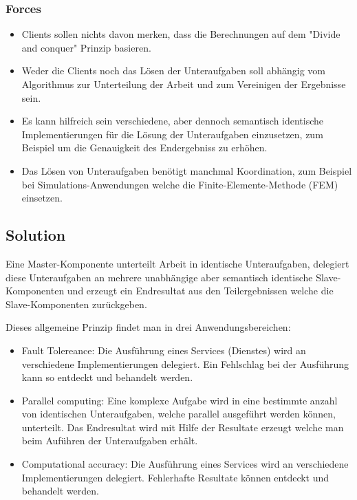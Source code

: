 \subsubsection*{Forces}


\begin{itemize}
	\item Clients sollen nichts davon merken, dass die Berechnungen auf dem "Divide and conquer" Prinzip basieren.
	\item Weder die Clients noch das Lösen der Unteraufgaben soll abhängig vom Algorithmus zur Unterteilung der Arbeit und zum Vereinigen der Ergebnisse sein.
	\item Es kann hilfreich sein verschiedene, aber dennoch semantisch identische Implementierungen für die Lösung der Unteraufgaben einzusetzen, zum Beispiel um die Genauigkeit des Endergebniss zu erhöhen.
	\item Das Lösen von Unteraufgaben benötigt manchmal Koordination, zum Beispiel bei Simulations-Anwendungen welche die Finite-Elemente-Methode (FEM) einsetzen.
\end{itemize}

\subsection*{Solution}


Eine Master-Komponente unterteilt Arbeit in identische Unteraufgaben, delegiert diese Unteraufgaben an mehrere unabhängige aber semantisch identische Slave-Komponenten und erzeugt ein Endresultat aus den Teilergebnissen welche die Slave-Komponenten zurückgeben.

Dieses allgemeine Prinzip findet man in drei Anwendungsbereichen:

\begin{itemize}
	\item Fault Tolereance: Die Ausführung eines Services (Dienstes) wird an verschiedene Implementierungen delegiert. Ein Fehlschlag bei der Ausführung kann so entdeckt und behandelt werden.
	\item Parallel computing: Eine komplexe Aufgabe wird in eine bestimmte anzahl von identischen Unteraufgaben, welche parallel ausgeführt werden können, unterteilt. Das Endresultat wird mit Hilfe der Resultate erzeugt welche man beim Auführen der Unteraufgaben erhält.
	\item Computational accuracy: Die Ausführung eines Services wird an verschiedene Implementierungen delegiert. Fehlerhafte Resultate können entdeckt und behandelt werden.
\end{itemize}

